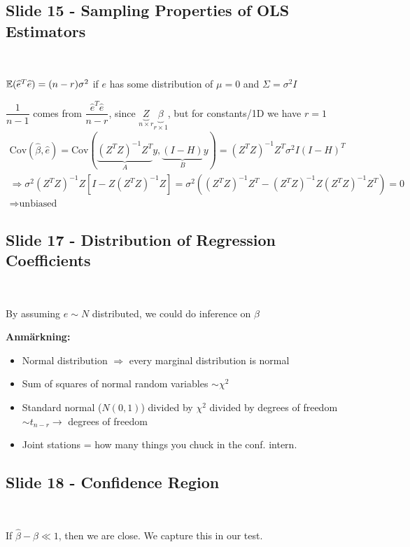 \subsection{Slide 15 - Sampling Properties of OLS Estimators}\hfill\\\par
\noindent $\mathbb{E}(\widehat{e}^T\widehat{e}) = (n-r)\sigma^2$ if $e$ has some distribution of $\mu= 0$ and $\Sigma = \sigma^2I$
\par\bigskip
\noindent $\dfrac{1}{n-1}$ comes from $\dfrac{\widehat{e}^T\widehat{e}}{n-r}$, since $\underbrace{Z}_{\text{$n\times r$}}\underbrace{\beta}_{\text{$r\times 1$}}$, but for constants/1D we have $r=1$
\begin{equation*}
  \begin{gathered}
    \text{Cov}\left(\widehat{\beta}, \widehat{e}\right) = \text{Cov}\left(\underbrace{(Z^TZ)^{-1}Z^T}_{\text{$A$}}y, \underbrace{(I-H)}_{\text{$B$}}y\right) = (Z^TZ)^{-1}Z^T\sigma^2I(I-H)^T\\
    \Rightarrow\sigma^2(Z^TZ)^{-1}Z[I-Z(Z^TZ)^{-1}Z] = \sigma^2((Z^TZ)^{-1}Z^T-(Z^TZ)^{-1}Z(Z^TZ)^{-1}Z^T) = 0\\
    \Rightarrow\text{unbiased}
  \end{gathered}
\end{equation*}
\par\bigskip
\subsection{Slide 17 - Distribution of Regression Coefficients}\hfill\\\par
\noindent By assuming $e\sim N$ distributed, we could do inference on $\beta$
\par\bigskip
\noindent\textbf{Anmärkning:}\par
\begin{itemize}
  \item Normal distribution $\Rightarrow$ every marginal distribution is normal
  \item Sum of squares of normal random variables $\sim \chi^2$
  \item Standard normal ($N(0,1)$) divided by $\chi^2$ divided by degrees of freedom $\sim t_{n-r}\rightarrow$ degrees of freedom
  \item Joint stations = how many things you chuck in the conf. intern.
\end{itemize}
\par\bigskip
\subsection{Slide 18 - Confidence Region}\hfill\\
\par\bigskip
\noindent If $\hat{\beta}-\beta\ll1$, then we are close. We capture this in our test. 
\par\bigskip
